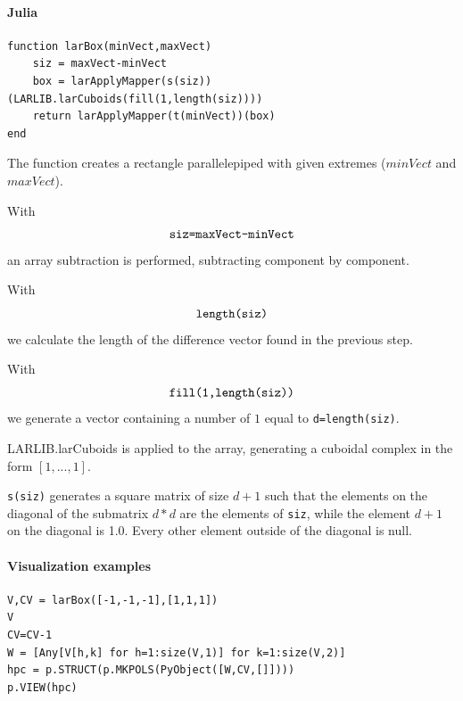 \documentclass{article}
\begin{document}
\paragraph{Julia}

\begin{verbatim}
function larBox(minVect,maxVect)
    siz = maxVect-minVect
    box = larApplyMapper(s(siz))(LARLIB.larCuboids(fill(1,length(siz))))
    return larApplyMapper(t(minVect))(box)
end 
\end{verbatim}

The  function creates a rectangle parallelepiped with given extremes ($minVect$ and $maxVect$).

With $$\verb!siz=maxVect-minVect!$$ an array subtraction is performed, subtracting component by component.

With $$\verb!length(siz)!$$ we calculate the length of the difference vector found in the previous step.

With $$\verb!fill(1,length(siz))!$$ we generate a vector containing a number of $1$ equal to \verb!d=length(siz)!.

LARLIB.larCuboids is applied to the array, generating a cuboidal complex in the form $[1,...,1]$.

\verb!s(siz)! generates a square matrix of size $d+1$ such that the elements on the diagonal of the submatrix $d*d$ are the elements of \verb!siz!, while the element $d+1$ on the diagonal is 1.0. Every other element outside of the diagonal is null.

\paragraph{Visualization examples}

\begin{verbatim}
V,CV = larBox([-1,-1,-1],[1,1,1])
V
CV=CV-1
W = [Any[V[h,k] for h=1:size(V,1)] for k=1:size(V,2)]
hpc = p.STRUCT(p.MKPOLS(PyObject([W,CV,[]])))
p.VIEW(hpc)
\end{verbatim}
\end{document}
